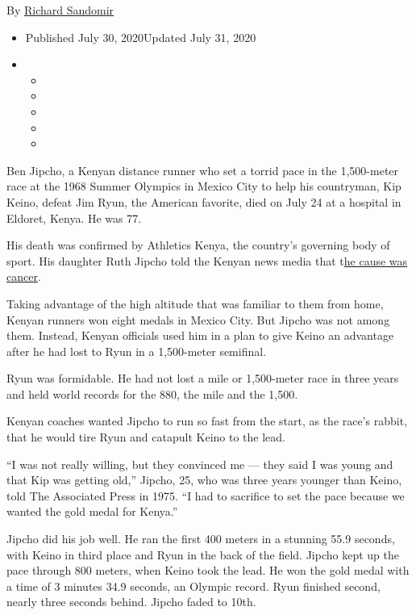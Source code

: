 By \href{https://www.nytimes3xbfgragh.onion/by/richard-sandomir}{Richard
Sandomir}

\begin{itemize}
\item
  Published July 30, 2020Updated July 31, 2020
\item
  \begin{itemize}
  \item
  \item
  \item
  \item
  \item
  \end{itemize}
\end{itemize}

Ben Jipcho, a Kenyan distance runner who set a torrid pace in the
1,500-meter race at the 1968 Summer Olympics in Mexico City to help his
countryman, Kip Keino, defeat Jim Ryun, the American favorite, died on
July 24 at a hospital in Eldoret, Kenya. He was 77.

His death was confirmed by Athletics Kenya, the country's governing body
of sport. His daughter Ruth Jipcho told the Kenyan news media that
t\href{https://www.pd.co.ke/sports/athletics/tributes-pour-in-for-olympian-jipcho-45426/}{he
cause was cancer}.

Taking advantage of the high altitude that was familiar to them from
home, Kenyan runners won eight medals in Mexico City. But Jipcho was not
among them. Instead, Kenyan officials used him in a plan to give Keino
an advantage after he had lost to Ryun in a 1,500-meter semifinal.

Ryun was formidable. He had not lost a mile or 1,500-meter race in three
years and held world records for the 880, the mile and the 1,500.

Kenyan coaches wanted Jipcho to run so fast from the start, as the
race's rabbit, that he would tire Ryun and catapult Keino to the lead.

``I was not really willing, but they convinced me --- they said I was
young and that Kip was getting old,'' Jipcho, 25, who was three years
younger than Keino, told The Associated Press in 1975. ``I had to
sacrifice to set the pace because we wanted the gold medal for Kenya.''

Jipcho did his job well. He ran the first 400 meters in a stunning 55.9
seconds, with Keino in third place and Ryun in the back of the field.
Jipcho kept up the pace through 800 meters, when Keino took the lead. He
won the gold medal with a time of 3 minutes 34.9 seconds, an Olympic
record. Ryun finished second, nearly three seconds behind. Jipcho faded
to 10th.

